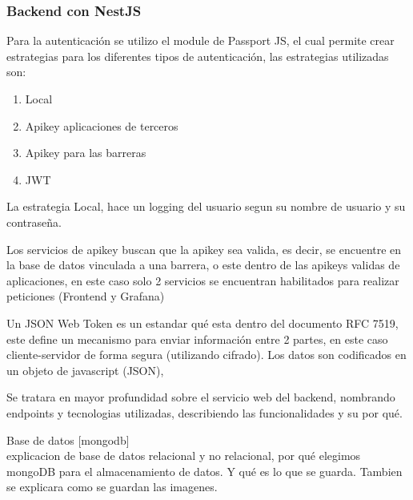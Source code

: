 \subsubsection*{Backend con NestJS}


Para la autenticación se utilizo el module de Passport JS, el cual permite crear estrategias para los diferentes tipos de autenticación, las estrategias utilizadas son:

\begin{enumerate}
        \item Local
        \item Apikey aplicaciones de terceros
        \item Apikey para las barreras
        \item JWT
\end{enumerate}

La estrategia Local, hace un logging del usuario segun su nombre de usuario y su contraseña.

Los servicios de apikey buscan que la apikey sea valida, es decir, se encuentre en la base de datos vinculada a una barrera, o este dentro de las apikeys validas de aplicaciones, en este caso solo 2 servicios se encuentran habilitados para realizar peticiones (Frontend y Grafana)

Un JSON Web Token es un estandar qué esta dentro del documento RFC 7519, este define un mecanismo para enviar información entre 2 partes, en este caso cliente-servidor de forma segura (utilizando cifrado). Los datos son codificados en un objeto de javascript (JSON),

Se tratara en mayor profundidad sobre el servicio web del backend, nombrando endpoints y tecnologias utilizadas, describiendo las funcionalidades y su por qué.


Base de datos [mongodb] \\

explicacion de base de datos relacional y no relacional, por qué elegimos mongoDB para el almacenamiento de datos. Y qué es lo que se guarda. Tambien se explicara como se guardan las imagenes. \\
